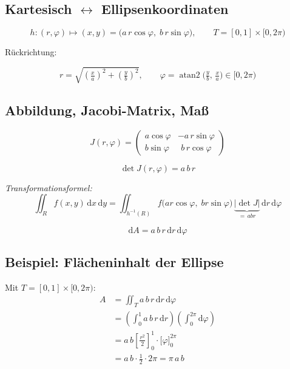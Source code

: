 \documentclass[a4paper,11pt,oneside,open=any,parskip=half, DIV=15]{scrreprt}
\begin{document}
   \subsection*{Kartesisch \(\leftrightarrow\) Ellipsenkoordinaten}
      \begin{importantbox}
         \[
            h:(r,\varphi)\mapsto (x,y)=\bigl(a\,r\cos\varphi,\; b\,r\sin\varphi\bigr),
            \qquad T=[0,1]\times[0,2\pi) %
         \]
      \end{importantbox}

      Rückrichtung:
      \begin{importantbox}
         \[
            r=\sqrt{\left(\tfrac{x}{a}\right)^{2}+\left(\tfrac{y}{b}\right)^{2}},\qquad
            \varphi=\operatorname{atan2}\!\bigl(\tfrac{y}{b},\,\tfrac{x}{a}\bigr)\in[0,2\pi)   %
         \]
      \end{importantbox}

   \subsection*{Abbildung, Jacobi-Matrix, Maß}
   \[
      J(r,\varphi)=
         \begin{pmatrix}
            a\cos\varphi & -a\,r\sin\varphi\\[2pt]
            b\sin\varphi & \ \,b\,r\cos\varphi
         \end{pmatrix}
   \]

   \begin{importantbox}
      \[
         \det J(r,\varphi)=a\,b\,r
      \]
   \end{importantbox}

   \textit{Transformationsformel: }\,
   \[
      \iint_{R} f(x,y)\,\mathrm{d}x\,\mathrm{d}y
      =
      \iint_{h^{-1}(R)} f\!\bigl(a r\cos\varphi,\; b r\sin\varphi\bigr)\,
      \underbrace{|\det J|}_{=\,a b r}\,\mathrm{d}r\,\mathrm{d}\varphi
   \]

   \begin{importantbox}
      \[
         \mathrm{d}A = a\,b\,r\,\mathrm{d}r\,\mathrm{d}\varphi
      \]
   \end{importantbox}

   \subsection*{Beispiel: Flächeninhalt der Ellipse}
      Mit \(T=[0,1]\times[0,2\pi)\):   %
      \begin{align*}
         A
         &= \iint_{T} a\,b\,r\,\mathrm dr\,\mathrm d\varphi \tag{Grundformel aufstellen}\\[4pt]
         &= \left(\int_{0}^{1} a\,b\,r\,\mathrm dr\right)\!
         \left(\int_{0}^{2\pi}\mathrm d\varphi\right) \tag{Grenzen separieren}\\[4pt]
         &= a\,b\left[\tfrac{r^{2}}{2}\right]_{0}^{1}\cdot \bigl[\varphi\bigr]_{0}^{2\pi} \tag{Integrale berechnen}\\[4pt]
         &= a\,b\cdot \tfrac{1}{2}\cdot 2\pi
         = \pi\,a\,b\tag{Ergebnis}
      \end{align*}
\end{document}
